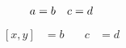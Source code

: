 \documentclass{article}
\begin{document}
\[ \begin{alignedat}[t]{2} a &= b &\quad c &= d \end{alignedat} \]
\[ \begin{alignedat}{2}
[x,y] &= b &\quad c &= d \end{alignedat} \]
\end{document}
